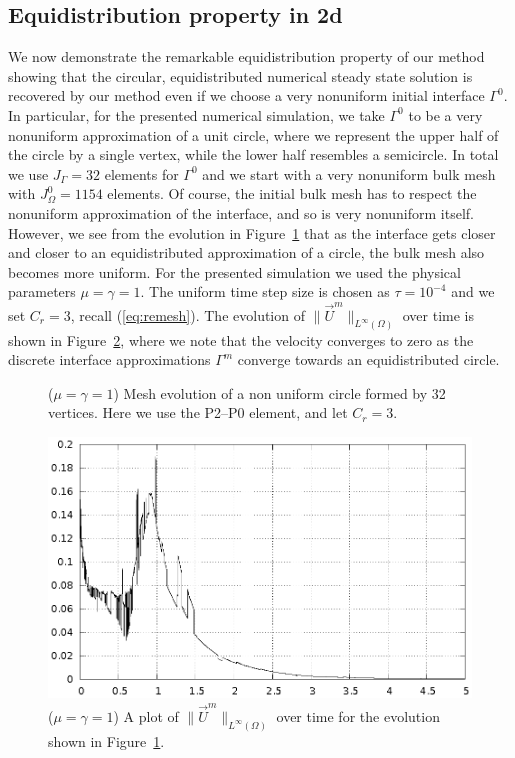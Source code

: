 \documentclass[a4paper,12pt,onecolumn]{article}
\begin{document}
\subsection{Equidistribution property in 2d}
We now demonstrate the remarkable equidistribution property of our method showing that the circular, equidistributed numerical steady state solution is recovered by our method even if we choose a very nonuniform initial interface $\Gamma^0$. 
In particular, for the presented numerical simulation, we take $\Gamma^0$ to 
be a very nonuniform approximation of a unit circle, where we represent the 
upper half of the circle by a single vertex, while the lower half resembles 
a semicircle. 
In total we use $J_\Gamma = 32$ elements for $\Gamma^0$ and we start with
a very nonuniform bulk mesh with $J_\Omega^0 = 1154$ elements.
Of course, the initial bulk mesh has to respect the nonuniform approximation 
of the interface, and so is very nonuniform itself.
However, we see from the evolution in Figure~\ref{fig:nonuniform_bubble_remesh}
that as the interface gets closer and closer to an equidistributed
approximation of a circle, the bulk mesh also becomes more uniform. For
the presented simulation we used the physical parameters
$\mu= \gamma=1$. The uniform time step size is chosen as $\tau=10^{-4}$ and 
we set $C_r=3$, recall (\ref{eq:remesh}). 
The evolution of $\|\vec U^m\|_{L^\infty(\Omega)}$ over time is shown in
Figure~\ref{fig:nonuniform_bubble_velocity_remesh}, where we note that the
velocity converges to zero as the discrete interface approximations 
$\Gamma^m$ converge towards an equidistributed circle.
\begin{figure}[htbp]
  \centering
  \caption{($\mu=\gamma=1$) Mesh evolution of a non uniform circle formed by 32 vertices. Here we use the P2--P0 element, and let $C_r = 3$.}
  \label{fig:nonuniform_bubble_remesh}
\end{figure}

\begin{figure}[htbp]
  \centering
  \includegraphics[width=.45\textwidth]{figures/nonuniform_bubble_velocity_remesh.ps}
\caption{($\mu=\gamma=1$) A plot of $\|\vec U^m\|_{L^\infty(\Omega)}$ over time
for the evolution shown in Figure~\ref{fig:nonuniform_bubble_remesh}.}
\label{fig:nonuniform_bubble_velocity_remesh}
\end{figure}
\end{document}
